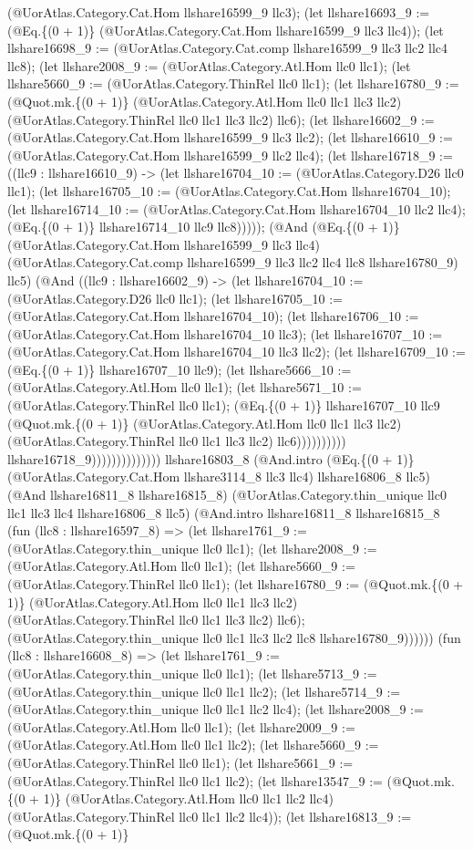 \documentclass[11pt]{article}
\begin{document}
(@UorAtlas.Category.Cat.Hom llshare16599\_9 llc3); (let llshare16693\_9 := (@Eq.\{(0 + 1)\} (@UorAtlas.Category.Cat.Hom llshare16599\_9 llc3 llc4)); (let llshare16698\_9 := (@UorAtlas.Category.Cat.comp llshare16599\_9 llc3 llc2 llc4 llc8); (let llshare2008\_9 := (@UorAtlas.Category.Atl.Hom llc0 llc1); (let llshare5660\_9 := (@UorAtlas.Category.ThinRel llc0 llc1); (let llshare16780\_9 := (@Quot.mk.\{(0 + 1)\} (@UorAtlas.Category.Atl.Hom llc0 llc1 llc3 llc2) (@UorAtlas.Category.ThinRel llc0 llc1 llc3 llc2) llc6); (let llshare16602\_9 := (@UorAtlas.Category.Cat.Hom llshare16599\_9 llc3 llc2); (let llshare16610\_9 := (@UorAtlas.Category.Cat.Hom llshare16599\_9 llc2 llc4); (let llshare16718\_9 := ((llc9 : llshare16610\_9) -> (let llshare16704\_10 := (@UorAtlas.Category.D26 llc0 llc1); (let llshare16705\_10 := (@UorAtlas.Category.Cat.Hom llshare16704\_10); (let llshare16714\_10 := (@UorAtlas.Category.Cat.Hom llshare16704\_10 llc2 llc4); (@Eq.\{(0 + 1)\} llshare16714\_10 llc9 llc8))))); (@And (@Eq.\{(0 + 1)\} (@UorAtlas.Category.Cat.Hom llshare16599\_9 llc3 llc4) (@UorAtlas.Category.Cat.comp llshare16599\_9 llc3 llc2 llc4 llc8 llshare16780\_9) llc5) (@And ((llc9 : llshare16602\_9) -> (let llshare16704\_10 := (@UorAtlas.Category.D26 llc0 llc1); (let llshare16705\_10 := (@UorAtlas.Category.Cat.Hom llshare16704\_10); (let llshare16706\_10 := (@UorAtlas.Category.Cat.Hom llshare16704\_10 llc3); (let llshare16707\_10 := (@UorAtlas.Category.Cat.Hom llshare16704\_10 llc3 llc2); (let llshare16709\_10 := (@Eq.\{(0 + 1)\} llshare16707\_10 llc9); (let llshare5666\_10 := (@UorAtlas.Category.Atl.Hom llc0 llc1); (let llshare5671\_10 := (@UorAtlas.Category.ThinRel llc0 llc1); (@Eq.\{(0 + 1)\} llshare16707\_10 llc9 (@Quot.mk.\{(0 + 1)\} (@UorAtlas.Category.Atl.Hom llc0 llc1 llc3 llc2) (@UorAtlas.Category.ThinRel llc0 llc1 llc3 llc2) llc6)))))))))) llshare16718\_9)))))))))))))) llshare16803\_8 (@And.intro (@Eq.\{(0 + 1)\} (@UorAtlas.Category.Cat.Hom llshare3114\_8 llc3 llc4) llshare16806\_8 llc5) (@And llshare16811\_8 llshare16815\_8) (@UorAtlas.Category.thin\_unique llc0 llc1 llc3 llc4 llshare16806\_8 llc5) (@And.intro llshare16811\_8 llshare16815\_8 (fun (llc8 : llshare16597\_8) => (let llshare1761\_9 := (@UorAtlas.Category.thin\_unique llc0 llc1); (let llshare2008\_9 := (@UorAtlas.Category.Atl.Hom llc0 llc1); (let llshare5660\_9 := (@UorAtlas.Category.ThinRel llc0 llc1); (let llshare16780\_9 := (@Quot.mk.\{(0 + 1)\} (@UorAtlas.Category.Atl.Hom llc0 llc1 llc3 llc2) (@UorAtlas.Category.ThinRel llc0 llc1 llc3 llc2) llc6); (@UorAtlas.Category.thin\_unique llc0 llc1 llc3 llc2 llc8 llshare16780\_9)))))) (fun (llc8 : llshare16608\_8) => (let llshare1761\_9 := (@UorAtlas.Category.thin\_unique llc0 llc1); (let llshare5713\_9 := (@UorAtlas.Category.thin\_unique llc0 llc1 llc2); (let llshare5714\_9 := (@UorAtlas.Category.thin\_unique llc0 llc1 llc2 llc4); (let llshare2008\_9 := (@UorAtlas.Category.Atl.Hom llc0 llc1); (let llshare2009\_9 := (@UorAtlas.Category.Atl.Hom llc0 llc1 llc2); (let llshare5660\_9 := (@UorAtlas.Category.ThinRel llc0 llc1); (let llshare5661\_9 := (@UorAtlas.Category.ThinRel llc0 llc1 llc2); (let llshare13547\_9 := (@Quot.mk.\{(0 + 1)\} (@UorAtlas.Category.Atl.Hom llc0 llc1 llc2 llc4) (@UorAtlas.Category.ThinRel llc0 llc1 llc2 llc4)); (let llshare16813\_9 := (@Quot.mk.\{(0 + 1)\} 
\end{document}
